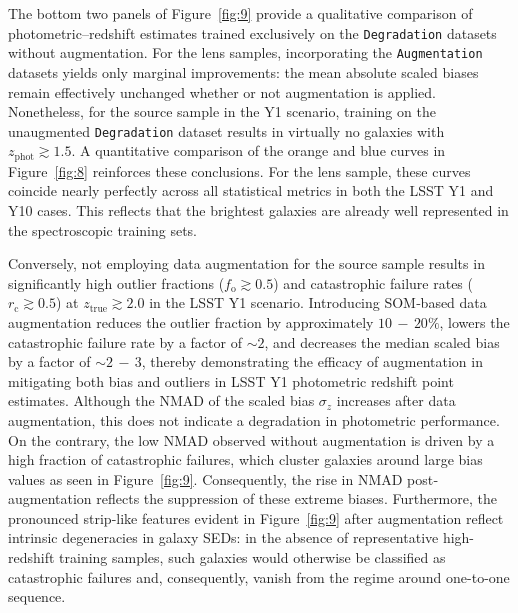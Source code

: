 The bottom two panels of Figure~\ref{fig:9} provide a qualitative comparison of photometric–redshift estimates trained exclusively on the \texttt{Degradation} datasets without augmentation. For the lens samples, incorporating the \texttt{Augmentation} datasets yields only marginal improvements: the mean absolute scaled biases remain effectively unchanged whether or not augmentation is applied. Nonetheless, for the source sample in the Y1 scenario, training on the unaugmented \texttt{Degradation} dataset results in virtually no galaxies with \(z_{\mathrm{phot}} \gtrsim 1.5\). A quantitative comparison of the orange and blue curves in Figure~\ref{fig:8} reinforces these conclusions. For the lens sample, these curves coincide nearly perfectly across all statistical metrics in both the LSST Y1 and Y10 cases. This reflects that the brightest galaxies are already well represented in the spectroscopic training sets.

Conversely, not employing data augmentation for the source sample results in significantly high outlier fractions (\(f_{\mathrm{o}} \gtrsim 0.5\)) and catastrophic failure rates (\(r_{\mathrm{c}} \gtrsim 0.5\)) at \(z_{\mathrm{true}} \gtrsim 2.0\) in the LSST Y1 scenario. Introducing SOM‐based data augmentation reduces the outlier fraction by approximately \(10 \,{-}\, 20\%\), lowers the catastrophic failure rate by a factor of \(\sim 2\), and decreases the median scaled bias by a factor of \(\sim 2 \,{-}\, 3\), thereby demonstrating the efficacy of augmentation in mitigating both bias and outliers in LSST Y1 photometric redshift point estimates. Although the NMAD of the scaled bias \(\sigma_z\) increases after data augmentation, this does not indicate a degradation in photometric performance. On the contrary, the low NMAD observed without augmentation is driven by a high fraction of catastrophic failures, which cluster galaxies around large bias values as seen in Figure~\ref{fig:9}. Consequently, the rise in NMAD post‐augmentation reflects the suppression of these extreme biases. Furthermore, the pronounced strip-like features evident in Figure~\ref{fig:9} after augmentation reflect intrinsic degeneracies in galaxy SEDs: in the absence of representative high-redshift training samples, such galaxies would otherwise be classified as catastrophic failures and, consequently, vanish from the regime around one-to-one sequence.


